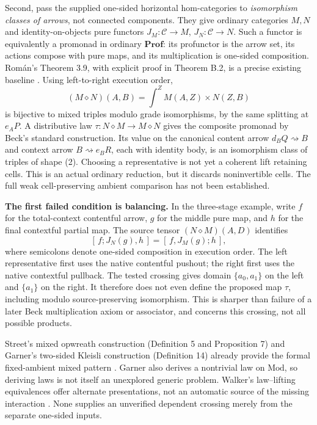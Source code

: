 \documentclass[11pt,a4paper]{article}
\newcommand{\C}{\mathcal C}
\begin{document}
Second, pass the supplied one-sided horizontal hom-categories to
\emph{isomorphism classes of arrows}, not connected components. They give ordinary
categories \(M,N\) and identity-on-objects pure functors
\(J_M:\C\to M\), \(J_N:\C\to N\). Such a functor is equivalently a
promonad in ordinary \(\mathbf{Prof}\): its profunctor is the arrow set,
its actions compose with pure maps, and its multiplication is one-sided
composition. Rom\'an's Theorem 3.9, with explicit proof in Theorem B.2, is a
precise existing baseline \cite{Roman}.
Using left-to-right execution order,
\[
 (M\diamond N)(A,B)=\int^Z M(A,Z)\times N(Z,B)
\]
is bijective to mixed triples modulo grade isomorphisms, by the same splitting
at \(e_AP\). A distributive law
\(\tau:N\diamond M\to M\diamond N\) gives the composite promonad by Beck's
standard construction. Its value on the canonical content arrow
\(d_BQ\rightsquigarrow B\) and context arrow
\(B\rightsquigarrow e_BR\), each with identity body, is an isomorphism class of triples of shape (2).
Choosing a representative is not yet a coherent lift retaining cells.
This is an actual ordinary reduction, but it discards noninvertible cells.
The full weak cell-preserving ambient comparison has not been established.

\textbf{The first failed condition is balancing.}
In the three-stage example, write \(f\) for the total-context contentful arrow,
\(g\) for the middle pure map, and \(h\) for the final contextful partial map.
The source tensor \((N\diamond M)(A,D)\) identifies
\[
 [\,f;J_N(g),h\,]=[\,f,J_M(g);h\,],
 \tag{12}
\]
where semicolons denote one-sided composition in execution order. The left
representative first uses the native contentful pushout; the right first uses
the native contextful pullback. The tested crossing gives domain
\(\{a_0,a_1\}\) on the left and \(\{a_1\}\) on the right.
It therefore does not even define the proposed map \(\tau\), including modulo
source-preserving isomorphism. This is sharper than failure of a later Beck
multiplication axiom or associator, and concerns this crossing, not all possible
products.

Street's mixed opwreath construction (Definition 5 and Proposition 7) and
Garner's two-sided Kleisli construction (Definition 14) already provide the
formal fixed-ambient mixed pattern \cite{Street,Garner}. Garner also derives a
nontrivial law on \(\mathrm{Mod}\), so deriving laws is not itself an unexplored
generic problem. Walker's law--lifting equivalences offer alternate presentations,
not an automatic source of the missing interaction \cite{Walker}. None supplies
an unverified dependent crossing merely from the separate one-sided inputs.
\end{document}
